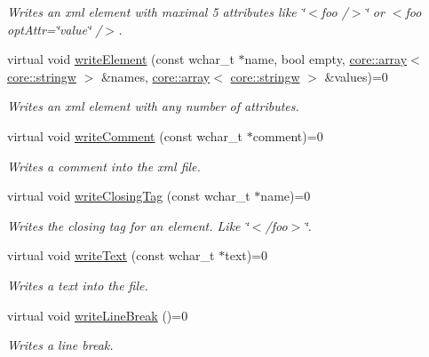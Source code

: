 \begin{DoxyCompactItemize}
\begin{DoxyCompactList}\small\item\em Writes an xml element with maximal 5 attributes like \char`\"{}$<$foo /$>$\char`\"{} or $<$foo opt\+Attr=\char`\"{}value\char`\"{} /$>$. \end{DoxyCompactList}\item 
\mbox{\label{classirr_1_1io_1_1IXMLWriter_a78bbf9835512bb404c34339c1a34ea31}} 
virtual void \hyperlink{classirr_1_1io_1_1IXMLWriter_a78bbf9835512bb404c34339c1a34ea31}{write\+Element} (const wchar\+\_\+t $\ast$name, bool empty, \hyperlink{classirr_1_1core_1_1array}{core\+::array}$<$ \hyperlink{namespaceirr_1_1core_a5aedb62cb47cf01d1c548ab5e6344d2d}{core\+::stringw} $>$ \&names, \hyperlink{classirr_1_1core_1_1array}{core\+::array}$<$ \hyperlink{namespaceirr_1_1core_a5aedb62cb47cf01d1c548ab5e6344d2d}{core\+::stringw} $>$ \&values)=0
\begin{DoxyCompactList}\small\item\em Writes an xml element with any number of attributes. \end{DoxyCompactList}\item 
\mbox{\label{classirr_1_1io_1_1IXMLWriter_af6de322540d69764bd33a384763babd1}} 
virtual void \hyperlink{classirr_1_1io_1_1IXMLWriter_af6de322540d69764bd33a384763babd1}{write\+Comment} (const wchar\+\_\+t $\ast$comment)=0
\begin{DoxyCompactList}\small\item\em Writes a comment into the xml file. \end{DoxyCompactList}\item 
\mbox{\label{classirr_1_1io_1_1IXMLWriter_a904c931fe03455eee04fcf41ef519715}} 
virtual void \hyperlink{classirr_1_1io_1_1IXMLWriter_a904c931fe03455eee04fcf41ef519715}{write\+Closing\+Tag} (const wchar\+\_\+t $\ast$name)=0
\begin{DoxyCompactList}\small\item\em Writes the closing tag for an element. Like \char`\"{}$<$/foo$>$\char`\"{}. \end{DoxyCompactList}\item 
virtual void \hyperlink{classirr_1_1io_1_1IXMLWriter_a321adae57bcf06aadd2dda57eba1e4a6}{write\+Text} (const wchar\+\_\+t $\ast$text)=0
\begin{DoxyCompactList}\small\item\em Writes a text into the file. \end{DoxyCompactList}\item 
\mbox{\label{classirr_1_1io_1_1IXMLWriter_a98d9b558d991211f77f6d3f2f68d30d2}} 
virtual void \hyperlink{classirr_1_1io_1_1IXMLWriter_a98d9b558d991211f77f6d3f2f68d30d2}{write\+Line\+Break} ()=0
\begin{DoxyCompactList}\small\item\em Writes a line break. \end{DoxyCompactList}\end{DoxyCompactItemize}
